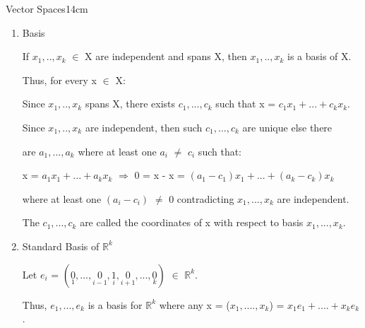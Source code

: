 \begin{definition}{Vector Spaces}{14cm}
\begin{enumerate}[label=(\alph*), leftmargin=0.5cm, itemsep=0.1cm]
                \vspace{0.2cm}

                If vector space X have r independent vectors, but not r+1
                independent vectors, then dim(X) = r.
                The set \{0\} has dimension 0.

            \item {\color{lblue} Basis}
                
                If $x_1,..,x_k$ $\in$ X are independent and spans X, then
                $x_1,..,x_k$ is a basis of X.

                Thus, for every x $\in$ X:

                \hspace{0.5cm}
                Since $x_1,..,x_k$ spans X, there exists $c_1,...,c_k$ such that
                x = $c_1x_1 + ... + c_kx_k$.

                \hspace{0.5cm}
                Since $x_1,..,x_k$ are independent, then such $c_1,...,c_k$
                are unique else there
                
                \hspace{0.5cm}
                are $a_1,...,a_k$ where at least one
                $a_i$ $\not =$ $c_i$ such that:

                \hspace{1cm}
                x = $a_1x_1 + ... + a_kx_k$
                \hspace{0.5cm}
                $\Rightarrow$
                \hspace{0.5cm}
                0 = x - x = $(a_1-c_1)x_1 + ... + (a_k-c_k)x_k$

                \hspace{0.5cm}
                where at least one $(a_i - c_i)$ $\not =$ 0
                contradicting $x_1,...,x_k$ are independent.

                The $c_1,...,c_k$ are called the coordinates of x
                with respect to basis $x_1,...,x_k$.

            \item Standard Basis of $\mathbb{R}^k$
            
                Let $e_i$
                = $(\underset{\scriptscriptstyle 1}{0},...,
                    \underset{\scriptscriptstyle i-1}{0},
                    \underset{\scriptscriptstyle i}{1},
                    \underset{\scriptscriptstyle i+1}{0},...,
                    \underset{\scriptscriptstyle k}{0})$
                $\in$ $\mathbb{R}^k$.

                Thus, $e_1,...,e_k$ is a basis for $\mathbb{R}^k$
                where any x = ($x_1,....,x_k$) = $x_1e_1 + .... + x_ke_k$.
        \end{enumerate}
    \end{definition}

